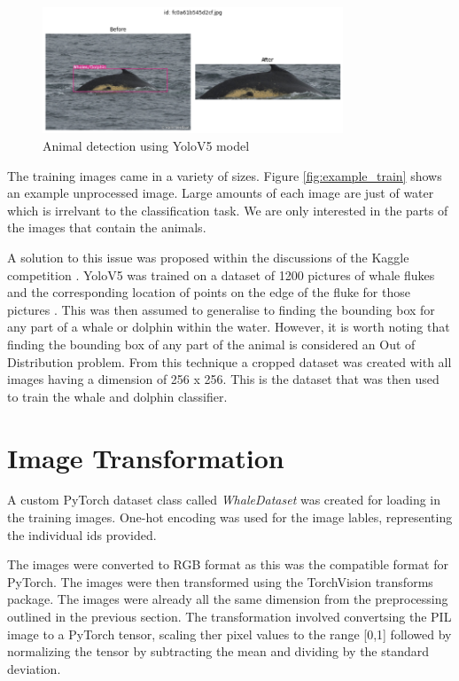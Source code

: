\documentclass{article}
\begin{document}
\begin{figure}
    \centering
    \includegraphics[width=0.8\textwidth]{image_cropping.png}
    \caption{Animal detection using YoloV5 model}
    \label{fig:image_cropping}
\end{figure}


The training images came in a variety of sizes. Figure \ref{fig:example_train} shows an example unprocessed image. Large amounts of each image are just of water which is irrelvant to the classification task. We are only interested in the parts of the 
images that contain the animals.

A solution to this issue was proposed within the discussions of the Kaggle competition \cite{cropped_dataset_kaggle}. YoloV5 was trained on a dataset of 1200 pictures of whale flukes and the corresponding location of points on the edge of the fluke for those pictures \cite{whale_fluke_dataset}. 
This was then assumed to generalise to finding the bounding box for any part of a whale or dolphin within the water. However, it is worth noting that finding the bounding box of any part of the animal is considered an Out of Distribution problem. From this technique a cropped dataset was created with all images having a dimension of 256 x 256. This is the dataset that was then used to train the whale 
and dolphin classifier.


\section {Image Transformation}

A custom PyTorch dataset class called \emph{WhaleDataset} was created for loading in the training images. One-hot encoding was used for the image lables, representing the individual ids provided.

The images were converted to RGB format as this was the compatible format for PyTorch. The images were then transformed using the TorchVision transforms package. The images were already all the same dimension from the preprocessing outlined in the previous section. 
The transformation involved convertsing the PIL image to a PyTorch tensor, scaling ther pixel values to the range [0,1] followed by normalizing the tensor by subtracting the mean and dividing by the standard deviation.
\end{document}
